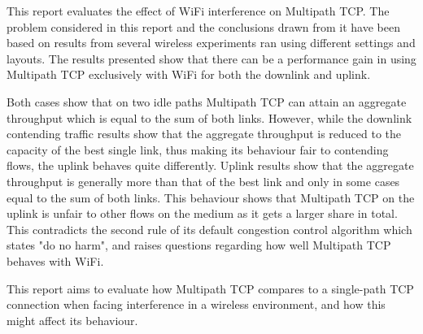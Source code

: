 This report evaluates the effect of WiFi interference on Multipath TCP. The 
problem considered in this report and the conclusions drawn from it have been 
based on results from several wireless experiments ran using different settings 
and layouts. The results presented show that there can be a performance gain 
in using Multipath TCP exclusively with WiFi for both the downlink and uplink.

Both cases show that on two idle paths Multipath TCP can attain an aggregate
throughput which is equal to the sum of both links. However, while the downlink 
contending traffic results show that the aggregate throughput is reduced to the 
capacity of the best single link, thus making its behaviour fair to contending 
flows, the uplink behaves quite differently.
Uplink results show that the aggregate throughput is generally more than that of 
the best link and only in some cases equal to the sum of both links. This 
behaviour shows that Multipath TCP on the uplink is unfair to other flows on the 
medium as it gets a larger share in total. This contradicts the second rule of 
its default congestion control algorithm which states "do no harm", and raises 
questions regarding how well Multipath TCP behaves with WiFi.

This report aims to evaluate how Multipath TCP compares to a single-path TCP 
connection when facing interference in a wireless environment, and how this 
might affect its behaviour.

